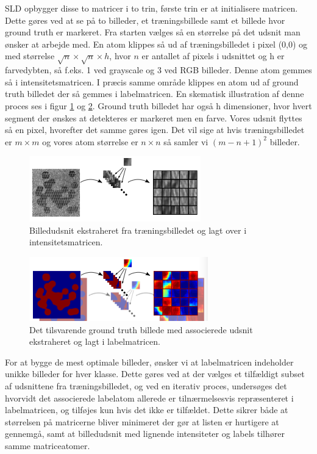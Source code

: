 SLD opbygger disse to matricer i to trin, første trin er at initialisere matricen. Dette gøres ved at se på to billeder, et træningsbillede samt et billede hvor ground truth er markeret. Fra starten vælges så en størrelse på det udsnit man ønsker at arbejde med. En atom klippes så ud af træningsbilledet i pixel (0,0) og med størrelse $\sqrt{n}\times\sqrt{n}\times h$, hvor $n$ er antallet af pixels i udsnittet og h er farvedybten, så f.eks. 1 ved grayscale og 3 ved RGB billeder. Denne atom gemmes så i intensitetsmatricen. I præcis samme område klippes en atom ud af ground truth billedet der så gemmes i labelmatricen. En skematisk illustration af denne proces ses i figur \ref{fig:postmethod_intensitydict_init} og \ref{fig:postmethod_labeldict_init}. Ground truth billedet har også h dimensioner, hvor hvert segment der ønskes at detekteres er markeret men en farve. Vores udsnit flyttes så en pixel, hvorefter det samme gøres igen. Det vil sige at hvis træningsbilledet er $m\times m$ og vores atom størrelse er $n\times n$ så samler vi $(m-n+1)^2$ billeder. 

\begin{figure}[H]
		\centering
		\includegraphics[scale=1]{files/postmethod/img/dict_1.png}
	\caption{Billedudsnit ekstraheret fra træningsbilledet og lagt over i intensitetsmatricen. \label{fig:postmethod_intensitydict_init}}
\end{figure}

\begin{figure}[H]
		\centering
		\includegraphics[scale=1]{files/postmethod/img/dict_2.png}
	\caption{Det tilsvarende ground truth billede med associerede udsnit ekstraheret og lagt i labelmatricen.\label{fig:postmethod_labeldict_init}}
\end{figure}

For at bygge de mest optimale billeder, ønsker vi at labelmatricen indeholder unikke billeder for hver klasse. Dette gøres ved at der vælges et tilfældigt subset af udsnittene fra træningsbilledet, og ved en iterativ proces, undersøges det hvorvidt det associerede labelatom allerede er tilnærmelsesvis repræsenteret i labelmatricen, og tilføjes kun hvis det ikke er tilfældet. Dette sikrer både at størrelsen på matricerne bliver minimeret der gør at listen er hurtigere at gennemgå, samt at billedudsnit med lignende intensiteter og labels tilhører samme matriceatomer. 

